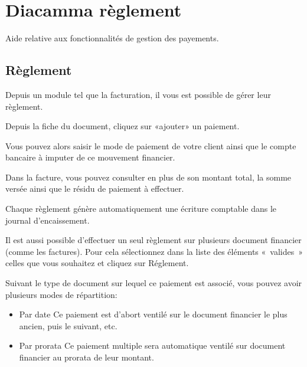 \documentclass[a4paper,10pt,oneside,french]{sphinxmanual}
\begin{document}
\chapter{Diacamma règlement}
\label{\detokenize{payoff/index:diacamma-reglement}}\label{\detokenize{payoff/index::doc}}
Aide relative aux fonctionnalités de gestion des payements.


\section{Règlement}
\label{\detokenize{payoff/payoff:reglement}}\label{\detokenize{payoff/payoff::doc}}
Depuis un module tel que la facturation, il vous est possible de gérer leur règlement.

Depuis la fiche du document, cliquez sur «ajouter» un paiement.
\begin{quote}

\noindent{}
\end{quote}

Vous pouvez alors saisir le mode de paiement de votre client ainsi que le compte bancaire à imputer de ce mouvement financier.

Dans la facture, vous pouvez consulter en plus de son montant total, la somme versée ainsi que le résidu de paiement à effectuer.

Chaque règlement génère automatiquement une écriture comptable dans le journal d’encaissement.

Il est aussi possible d’effectuer un seul règlement sur plusieurs document financier (comme les factures). Pour cela sélectionnez dans la liste des éléments « valides » celles que vous souhaitez et cliquez sur Réglement.
\begin{quote}

\noindent{}
\end{quote}

Suivant le type de document sur lequel ce paiement est associé, vous pouvez avoir plusieurs modes de répartition:
\begin{itemize}
\item {} 
Par date
Ce paiement est d’abort ventilé sur le document financier le plus ancien, puis le suivant, etc.

\item {} 
Par prorata
Ce paiement multiple sera automatique ventilé sur document financier au prorata de leur montant.

\end{itemize}
\end{document}
